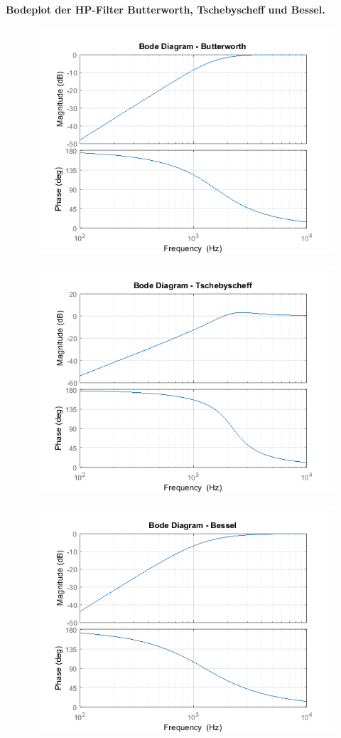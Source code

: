 \textbf{Bodeplot der HP-Filter Butterworth, Tschebyscheff und Bessel.}

\begin{figure}[h]
	\centering
	\includegraphics[width=0.7\linewidth]{Bilder/HP_Butterworth}
	\caption{}
	\label{fig:HP_Butterworth}
\end{figure}

\begin{figure}[h]
	\centering
	\includegraphics[width=0.7\linewidth]{Bilder/HP_Tschebyscheff}
	\caption{}
	\label{fig:HP_Tschebyscheff}
\end{figure}

\begin{figure}[h]
	\centering
	\includegraphics[width=0.7\linewidth]{Bilder/HP_Bessel}
	\caption{}
	\label{fig:HP_Bessel}
\end{figure}

